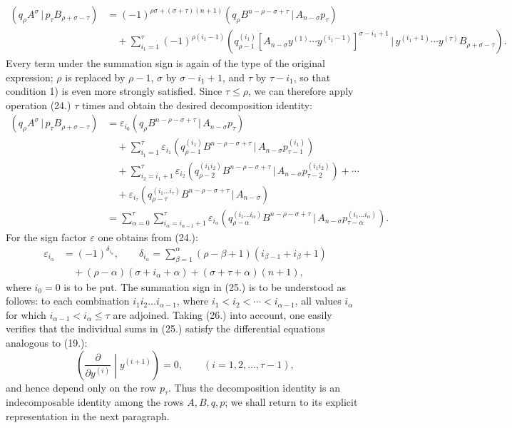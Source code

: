 \documentclass[11pt]{article}
\providecommand{\pair}[2]{(#1\,|\,#2)}
\providecommand{\eps}{\varepsilon}
\begin{document}
\begin{equation}
\begin{aligned}
\pair{q_\rho A^\sigma}{p_\tau B_{\rho+\sigma-\tau}}
&=(-1)^{\rho\sigma+(\sigma+\tau)(n+1)}
  \pair{q_\rho B^{n-\rho-\sigma+\tau}}{A_{n-\sigma}p_\tau}\\
&\quad+\sum_{i_1=1}^{\tau}(-1)^{\rho(i_1-1)}
 \pair{q_{\rho-1}^{(i_1)}[A_{n-\sigma}y^{(1)}\cdots y^{(i_1-1)}]^{\sigma-i_1+1}}
 {y^{(i_1+1)}\cdots y^{(\tau)}B_{\rho+\sigma-\tau}}.
\end{aligned}
\tag{24}
\end{equation}
Every term under the summation sign is again of the type of the original expression; $\rho$ is replaced by $\rho-1$, $\sigma$ by $\sigma-i_1+1$, and $\tau$ by $\tau-i_1$, so that condition 1) is even more strongly satisfied. Since $\tau\le\rho$, we can therefore apply operation (24.) $\tau$ times and obtain the desired decomposition identity:
\begin{equation}
\begin{aligned}
\pair{q_\rho A^\sigma}{p_\tau B_{\rho+\sigma-\tau}}
&=\eps_{i_0}\pair{q_\rho B^{n-\rho-\sigma+\tau}}{A_{n-\sigma}p_\tau}\\
&\quad+\sum_{i_1=1}^{\tau}\eps_{i_1}
 \pair{q_{\rho-1}^{(i_1)}B^{n-\rho-\sigma+\tau}}{A_{n-\sigma}p_{\tau-1}^{(i_1)}}\\
&\quad+\sum_{i_2=i_1+1}^{\tau}\eps_{i_2}
 \pair{q_{\rho-2}^{(i_1i_2)}B^{n-\rho-\sigma+\tau}}{A_{n-\sigma}p_{\tau-2}^{(i_1i_2)}}+\cdots\\
&\quad+\eps_{i_\tau}\pair{q_{\rho-\tau}^{(i_1\ldots i_\tau)}B^{n-\rho-\sigma+\tau}}{A_{n-\sigma}}\\
&=\sum_{\alpha=0}^{\tau}\sum_{i_\alpha=i_{\alpha-1}+1}^{\tau}\eps_{i_\alpha}
 \pair{q_{\rho-\alpha}^{(i_1\ldots i_\alpha)}B^{n-\rho-\sigma+\tau}}{A_{n-\sigma}p_{\tau-\alpha}^{(i_1\ldots i_\alpha)}}.
\end{aligned}
\tag{25}
\end{equation}
For the sign factor $\eps$ one obtains from (24.):
\begin{equation}
\begin{aligned}
\eps_{i_\alpha}&=(-1)^{\delta_{i_\alpha}},\qquad
\delta_{i_\alpha}=\sum_{\beta=1}^{\alpha}(\rho-\beta+1)(i_{\beta-1}+i_\beta+1)\\
&\quad +(\rho-\alpha)(\sigma+i_\alpha+\alpha)+(\sigma+\tau+\alpha)(n+1),
\end{aligned}
\tag{26}
\end{equation}
where $i_0=0$ is to be put. The summation sign in (25.) is to be understood as follows: to each combination $i_1i_2\ldots i_{\alpha-1}$, where $i_1<i_2<\cdots<i_{\alpha-1}$, all values $i_\alpha$ for which $i_{\alpha-1}<i_\alpha\le\tau$ are adjoined. Taking (26.) into account, one easily verifies that the individual sums in (25.) satisfy the differential equations analogous to (19.):
\begin{equation}
 \left(\frac{\partial}{\partial y^{(i)}}\middle|y^{(i+1)}\right)=0,
 \qquad (i=1,2,\ldots,\tau-1),
\tag{27}
\end{equation}
and hence depend only on the row $p_\tau$. Thus the decomposition identity is an indecomposable identity among the rows $A,B,q,p$; we shall return to its explicit representation in the next paragraph.
\end{document}

